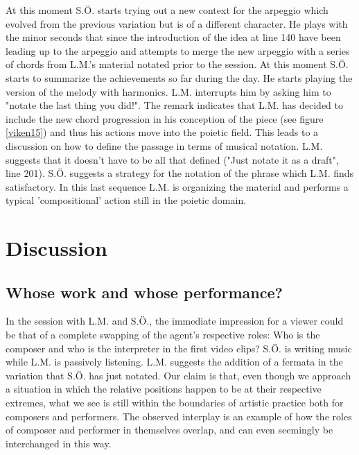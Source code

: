 \documentclass[10pt,letterpaper]{article}
\begin{document}
At this moment S.{\"O}. starts trying out a new context for the arpeggio
which evolved from the previous variation but is of a different
character.  He plays with the minor seconds that since the introduction
of the idea at line 140 have been leading up to the arpeggio and
attempts to merge the new arpeggio with a series of chords from L.M.'s
material notated prior to the session.  At this moment S.{\"O}. starts
to summarize the achievements so far during the day. He starts playing
the version of the melody with harmonics. L.M. interrupts him by asking
him to "notate the last thing you did!". The remark indicates that
L.M. has decided to include the new chord progression in his conception
of the piece (see figure \ref{viken15}) and thus his actions move into
the poietic field. This leads to a discussion on how to define the
passage in terms of musical notation. L.M. suggests that it doesn't have
to be all that defined ("Just notate it as a draft", line
201). S.{\"O}. suggests a strategy for the notation of the phrase which
L.M. finds satisfactory. In this last sequence L.M. is organizing the
material and performs a typical 'compositional' action still in the
poietic domain.

\section{Discussion}
\subsection{Whose work and whose performance?}

In the session with L.M. and S.{\"O}., the immediate impression for a
viewer could be that of a complete swapping of the agent's respective
roles: Who is the composer and who is the interpreter in the first video
clips? S.{\"O}. is writing music while L.M. is passively listening. L.M.
suggests the addition of a fermata in the variation that S.{\"O}. has just
notated. Our claim is that, even though we approach a situation in which
the relative positions happen to be at their respective extremes, what
we see is still within the boundaries of artistic practice both for
composers and performers. The observed interplay is an example of how
the roles of composer and performer in themselves overlap, and can even
seemingly be interchanged in this way.
\end{document}
